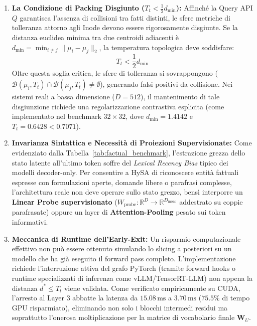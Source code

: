 \documentclass[11pt,a4paper]{article}
\theoremstyle{definition}
\begin{document}
\begin{enumerate}[leftmargin=*, itemsep=2.0pt]
    \item \textbf{La Condizione di Packing Disgiunto ($T_t < \frac{1}{2} d_{\min}$):} Affinché la Query API $Q$ garantisca l'assenza di collisioni tra fatti distinti, le sfere metriche di tolleranza attorno agli Inode devono essere rigorosamente disgiunte. Se la distanza euclidea minima tra due centroidi adiacenti è $d_{\min} = \min_{i \ne j} \|\mu_i - \mu_j\|_2$, la temperatura topologica deve soddisfare:
    \begin{equation}
        T_t < \frac{1}{2} d_{\min}
    \end{equation}
    Oltre questa soglia critica, le sfere di tolleranza si sovrappongono ($\mathcal{B}(\mu_i, T_t) \cap \mathcal{B}(\mu_j, T_t) \ne \emptyset$), generando falsi positivi da collisione. Nei sistemi reali a bassa dimensione ($D=512$), il mantenimento di tale disgiunzione richiede una regolarizzazione contrastiva esplicita (come implementato nel benchmark $32 \times 32$, dove $d_{\min} = 1.4142$ e $T_t = 0.6428 < 0.7071$).
    \item \textbf{Invarianza Sintattica e Necessità di Proiezioni Supervisionate:} Come evidenziato dalla Tabella~\ref{tab:factual_benchmark}, l'estrazione grezza dello stato latente all'ultimo token soffre del \textit{Lexical Recency Bias} tipico dei modelli decoder-only. Per consentire a HySA di riconoscere entità fattuali espresse con formulazioni aperte, domande libere o parafrasi complesse, l'architettura reale non deve operare sullo stato grezzo, bensì interporre un \textbf{Linear Probe supervisionato} ($W_{\mathrm{probe}}: \mathbb{R}^D \to \mathbb{R}^{D_{\mathrm{mono}}}$ addestrato su coppie parafrasate) oppure un layer di \textbf{Attention-Pooling} pesato sui token informativi.
    \item \textbf{Meccanica di Runtime dell'Early-Exit:} Un risparmio computazionale effettivo non può essere ottenuto simulando lo slicing a posteriori su un modello che ha già eseguito il forward pass completo. L'implementazione richiede l'interruzione attiva del grafo PyTorch (tramite forward hooks o runtime specializzati di inferenza come vLLM/TensorRT-LLM) non appena la distanza $d^* \le T_t$ viene validata. Come verificato empiricamente su CUDA, l'arresto al Layer 3 abbatte la latenza da $15.08\,\text{ms}$ a $3.70\,\text{ms}$ ($75.5\%$ di tempo GPU risparmiato), eliminando non solo i blocchi intermedi residui ma soprattutto l'onerosa moltiplicazione per la matrice di vocabolario finale $\mathbf{W}_U$.
\end{enumerate}
\end{document}
